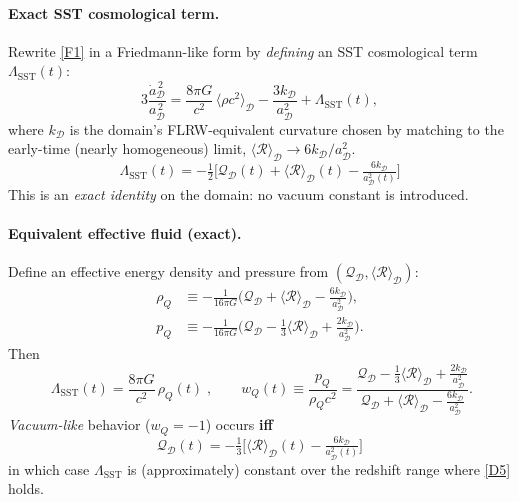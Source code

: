 \documentclass[10pt,reprint,aps,onecolumn,nofootinbib]{revtex4-2}
\begin{document}
    \paragraph{Exact SST cosmological term.}
        Rewrite \eqref{F1} in a Friedmann-like form by \emph{defining} an SST cosmological term $\Lambda_{\!\mathrm{SST}}(t)$:
        \[
            3\frac{\dot a_\mathcal{D}^{\,2}}{a_\mathcal{D}^{\,2}}
            = \frac{8\pi G}{c^2}\,\langle \rho c^2 \rangle_\mathcal{D}
            - \frac{3k_\mathcal{D}}{a_\mathcal{D}^{2}}
            + \Lambda_{\!\mathrm{SST}}(t),
        \]
        where $k_\mathcal{D}$ is the domain’s FLRW-equivalent curvature chosen by matching to the early-time (nearly homogeneous) limit, $\langle \mathcal{R} \rangle_\mathcal{D}\to 6k_\mathcal{D}/a_\mathcal{D}^2$.
        \[
            \boxed{\;
            \Lambda_{\!\mathrm{SST}}(t)
                = -\tfrac{1}{2}\Big[\mathcal{Q}_\mathcal{D}(t)
                +\langle \mathcal{R} \rangle_\mathcal{D}(t)
                - \tfrac{6k_\mathcal{D}}{a_\mathcal{D}^{2}(t)}\Big]
                \;}
            \tag{D1}\label{D1}
        \]
        This is an \emph{exact identity} on the domain: no vacuum constant is introduced.

    \paragraph{Equivalent effective fluid (exact).}
        Define an effective energy density and pressure from $(\mathcal{Q}_\mathcal{D},\langle \mathcal{R} \rangle_\mathcal{D})$:
        \begin{align}
            \rho_{Q} &\equiv -\frac{1}{16\pi G}\Big(\mathcal{Q}_\mathcal{D}+\langle \mathcal{R}\rangle_\mathcal{D}
            - \tfrac{6k_\mathcal{D}}{a_\mathcal{D}^{2}}\Big), \tag{D2}\label{D2}\\
            p_{Q} &\equiv -\frac{1}{16\pi G}\Big(\mathcal{Q}_\mathcal{D}-\tfrac{1}{3}\langle \mathcal{R}\rangle_\mathcal{D}
            + \tfrac{2k_\mathcal{D}}{a_\mathcal{D}^{2}}\Big). \tag{D3}\label{D3}
        \end{align}
        Then
        \[
            \boxed{\;
            \Lambda_{\!\mathrm{SST}}(t)=\frac{8\pi G}{c^2}\,\rho_{Q}(t)
                \;},\qquad
            w_Q(t)\equiv\frac{p_Q}{\rho_Q c^2}
            =\frac{\mathcal{Q}_\mathcal{D}-\tfrac{1}{3}\langle \mathcal{R}\rangle_\mathcal{D}
            +\tfrac{2k_\mathcal{D}}{a_\mathcal{D}^{2}}}
            {\mathcal{Q}_\mathcal{D}+\langle \mathcal{R}\rangle_\mathcal{D}
            -\tfrac{6k_\mathcal{D}}{a_\mathcal{D}^{2}}}.
            \tag{D4}\label{D4}
        \]
        \emph{Vacuum-like} behavior ($w_Q=-1$) occurs \textbf{iff}
        \[
            \boxed{\;\mathcal{Q}_\mathcal{D}(t)= -\tfrac{1}{3}\Big[\langle \mathcal{R}\rangle_\mathcal{D}(t)-\tfrac{6k_\mathcal{D}}{a_\mathcal{D}^{2}(t)}\Big]\;}
            \tag{D5}\label{D5}
        \]
        in which case $\Lambda_{\!\mathrm{SST}}$ is (approximately) constant over the redshift range where \eqref{D5} holds.
\end{document}
